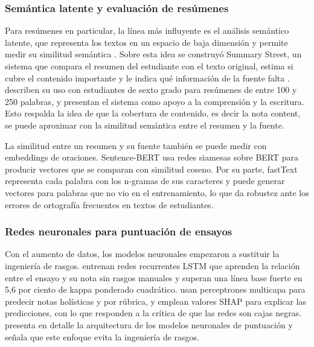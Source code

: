 \documentclass[11pt,a4paper]{article}
\begin{document}
\subsubsection{Semántica latente y evaluación de resúmenes}

Para resúmenes en particular, la línea más influyente es el análisis semántico latente, que representa los textos en un espacio de baja dimensión y permite medir su similitud semántica \citep{landauer1998}. Sobre esta idea se construyó Summary Street, un sistema que compara el resumen del estudiante con el texto original, estima si cubre el contenido importante y le indica qué información de la fuente falta \citep{kintsch2000}. \citet{wade2004} describen su uso con estudiantes de sexto grado para resúmenes de entre 100 y 250 palabras, y \citet{franzke2005} presentan el sistema como apoyo a la comprensión y la escritura. Esto respalda la idea de que la cobertura de contenido, es decir la nota content, se puede aproximar con la similitud semántica entre el resumen y la fuente.

La similitud entre un resumen y su fuente también se puede medir con embeddings de oraciones. Sentence-BERT \citep{reimers2019} usa redes siamesas sobre BERT para producir vectores que se comparan con similitud coseno. Por su parte, fastText \citep{bojanowski2017} representa cada palabra con los n-gramas de sus caracteres y puede generar vectores para palabras que no vio en el entrenamiento, lo que da robustez ante los errores de ortografía frecuentes en textos de estudiantes.

\subsubsection{Redes neuronales para puntuación de ensayos}

Con el aumento de datos, los modelos neuronales empezaron a sustituir la ingeniería de rasgos. \citet{taghipour2016} entrenan redes recurrentes LSTM \citep{hochreiter1997} que aprenden la relación entre el ensayo y su nota sin rasgos manuales y superan una línea base fuerte en 5,6 por ciento de kappa ponderado cuadrático. \citet{kumar2020} usan perceptrones multicapa para predecir notas holísticas y por rúbrica, y emplean valores SHAP para explicar las predicciones, con lo que responden a la crítica de que las redes son cajas negras. \citet{uto2021} presenta en detalle la arquitectura de los modelos neuronales de puntuación y señala que este enfoque evita la ingeniería de rasgos.
\end{document}

